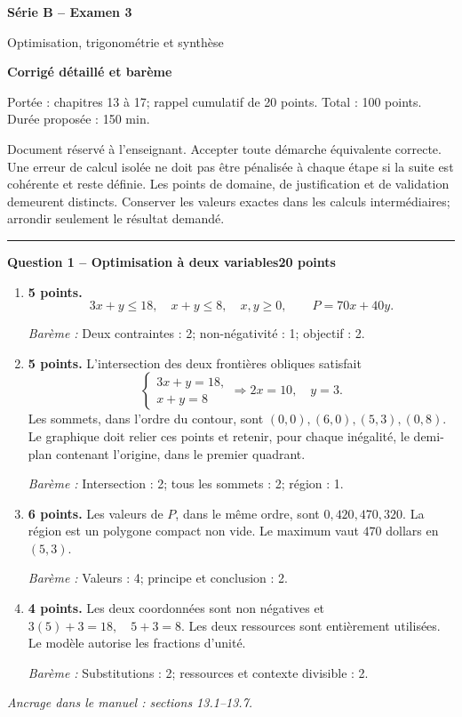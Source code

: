 \documentclass[11pt,a4paper]{article}
\begin{document}
{\LARGE\bfseries Série B -- Examen 3}\par
{\large Optimisation, trigonométrie et synthèse}\par
\textbf{Corrigé détaillé et barème}\par
Portée : chapitres 13 à 17; rappel cumulatif de 20 points. Total : 100 points. Durée proposée : 150 min.\par
\small Document réservé à l’enseignant. Accepter toute démarche équivalente correcte. Une erreur de calcul isolée ne doit pas être pénalisée à chaque étape si la suite est cohérente et reste définie. Les points de domaine, de justification et de validation demeurent distincts. Conserver les valeurs exactes dans les calculs intermédiaires; arrondir seulement le résultat demandé.\normalsize\par
\vspace{3mm}\hrule\vspace{4mm}
{\large\bfseries Question 1 -- Optimisation à deux variables}\hfill\textbf{20 points}\par
\begin{enumerate}
\item \textbf{5 points.} \[3x+y\le 18,\quad x+y\le 8,\quad x,y\ge0,\qquad P=70x+40y.\]
\par{\small\textit{Barème : }Deux contraintes : 2; non-négativité : 1; objectif : 2.}
\item \textbf{5 points.} L’intersection des deux frontières obliques satisfait \[\begin{cases}3x+y=18,\\x+y=8\end{cases}\Longrightarrow2x=10,\quad y=3.\] Les sommets, dans l’ordre du contour, sont \((0,0),(6,0),(5,3),(0,8)\). Le graphique doit relier ces points et retenir, pour chaque inégalité, le demi-plan contenant l’origine, dans le premier quadrant.
\par{\small\textit{Barème : }Intersection : 2; tous les sommets : 2; région : 1.}
\item \textbf{6 points.} Les valeurs de \(P\), dans le même ordre, sont \(0,420,470,320\). La région est un polygone compact non vide. Le maximum vaut \(470\) dollars en \((5,3)\).
\par{\small\textit{Barème : }Valeurs : 4; principe et conclusion : 2.}
\item \textbf{4 points.} Les deux coordonnées sont non négatives et \(3(5)+3=18,\quad5+3=8\). Les deux ressources sont entièrement utilisées. Le modèle autorise les fractions d’unité.
\par{\small\textit{Barème : }Substitutions : 2; ressources et contexte divisible : 2.}
\end{enumerate}
\vfill {\small\textit{Ancrage dans le manuel : sections 13.1--13.7.}}
\end{document}
